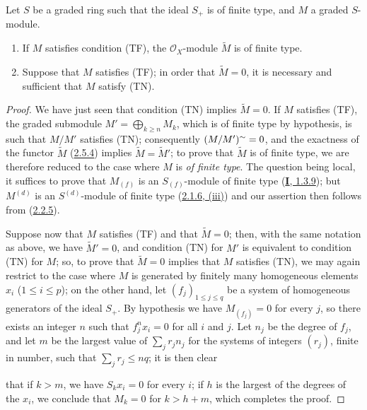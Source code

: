 \begin{proposition}[2.7.3]
\label{II.2.7.3}
Let $S$ be a graded ring such that the ideal $S_+$ is of finite type, and $M$ a
graded $S$-module.
\begin{enumerate}
  \item[\rm(i)] If $M$ satisfies condition \textup{(TF)}, the $\mathcal{O}_X$-module
    $\widetilde{M}$ is of finite type.
  \item[\rm(ii)] Suppose that $M$ satisfies \textup{(TF)}; in order that
    $\widetilde{M}=0$, it is necessary and sufficient that $M$ satisfy \textup{(TN)}.
\end{enumerate}
\end{proposition}

\begin{proof}
We have just seen that condition (TN) implies $\widetilde{M}=0$. If $M$
satisfies (TF), the graded submodule $M'=\bigoplus_{k\geq n}M_k$, which is of
finite type by hypothesis, is such that $M/M'$ satisfies (TN); consequently
$(M/M')^{\sim}=0$, and the exactness of the functor
$\widetilde{M}$ (\hyperref[II.2.5.4]{2.5.4}) implies
$\widetilde{M}=\widetilde{M}'$; to prove that $\widetilde{M}$ is of finite
type, we are therefore reduced to the case where $M$ is \emph{of finite type}. The
question being local, it suffices to prove that $M_{(f)}$ is an
$S_{(f)}$-module of finite type (\hyperref[I.1.3.9]{\textbf{I}, 1.3.9}); but
$M^{(d)}$ is an $S^{(d)}$-module of finite type
(\hyperref[II.2.1.6]{2.1.6, (iii)}) and our assertion then follows from
(\hyperref[II.2.2.5]{2.2.5}).

Suppose now that $M$ satisfies (TF) and that $\widetilde{M}=0$; then, with
the same notation as above, we have $\widetilde{M}'=0$, and condition (TN)
for $M'$ is equivalent to condition (TN) for $M$; so, to prove that
$\widetilde{M}=0$ implies that $M$ satisfies (TN), we may again restrict to
the case where $M$ is generated by finitely many homogeneous elements $x_i$
($1\leq i\leq p$); on the other hand, let $(f_j)_{1\leq j\leq q}$ be a system
of homogeneous generators of the ideal $S_+$. By hypothesis we have
$M_{(f_j)}=0$ for every $j$, so there exists an integer $n$ such that
$f_j^nx_i=0$ for all $i$ and $j$. Let $n_j$ be the degree of $f_j$, and let
$m$ be the largest value of $\sum_jr_jn_j$ for the systems of integers
$(r_j)$, finite in number, such that $\sum_jr_j\leq nq$; it is then clear

that if $k>m$, we have $S_kx_i=0$ for every $i$; if $h$ is the largest of the
degrees of the $x_i$, we conclude that $M_k=0$ for $k>h+m$, which completes
the proof.
\end{proof}

